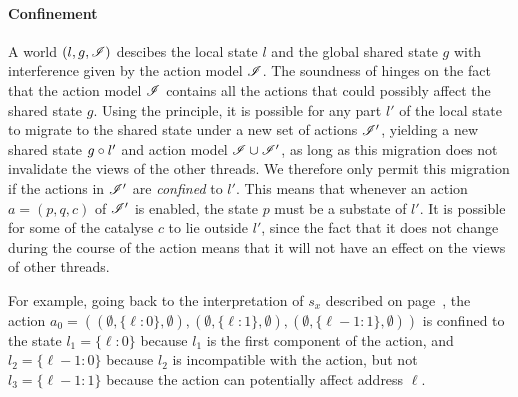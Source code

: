 

\paragraph{Confinement}

A \colosl world $(l,g,\mathscr{I})$ descibes the local state $l$ and the
global shared state $g$ with interference given by the action model
$\mathscr{I}$.  The soundness of \colosl hinges on the fact that the action
model $\mathscr{I}$ contains all the actions that could possibly affect the
shared state $g$. Using the \extendRule principle, it is possible for
any part $l'$ of the local state to migrate to the shared state under
a new set of actions $\mathscr{I}'$, yielding a new shared state $g\circ
l'$ and action model $\mathscr{I} \cup \mathscr{I}'$, as long as this migration
does not invalidate the views of the other threads. We therefore only
permit this migration if the actions in $\mathscr{I}'$ are \emph{confined}
to $l'$. This means that whenever an action $a = (p, q, c)$ of
$\mathscr{I}'$ is enabled, the state $p$ must be a substate of $l'$.  It is
possible for some of the catalyse $c$ to lie outside $l'$, since the
fact that it does not change during the course of the action means
that it will not have an effect on the views of other threads.

For example, going back to the interpretation of $s_x$ described on
page~\pageref{ex:sxsem}, the action $a_0 = ((\emptyset, \{\ell:0\},
\emptyset), (\emptyset, \{\ell:1\}, \emptyset), (\emptyset,
\{\ell{-}1:1\}, \emptyset))$ is confined to the state
$l_1=\{\ell:0\}$ because $l_1$ is the first component of the
action, and $l_2=\{\ell{-}1:0\}$ because $l_2$ is incompatible with the
action, but not $l_3=\{\ell{-}1:1\}$ because the action can
potentially affect address $\ell$.

